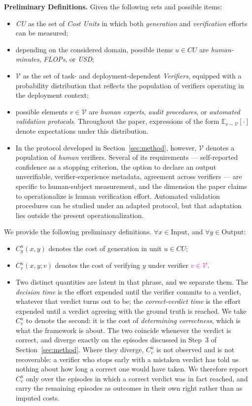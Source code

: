 \documentclass[11pt]{article}
\newcommand{\rev}[1]{\textcolor{magenta}{#1}}
\newcommand{\viola}[1]{\textcolor[HTML]{7030A0}{#1}}
\newcommand{\rev}[1]{#1}
\newcommand{\viola}[1]{#1}
\begin{document}
\textbf{{Preliminary Definitions}.}
{Given the following sets and possible items:}
\begin{itemize}
    \item {\emph{CU} as the set of \emph{Cost Units} in which both \emph{generation} and \emph{verification} efforts can be measured;}
    \item {depending on the considered domain, possible items $u \in CU$ are \emph{human-minutes}, \emph{FLOPs}, or \emph{USD}};
    \item {$\mathcal{V}$ as the set of task- and deployment-dependent \emph{Verifiers}, equipped with a probability distribution that reflects the population of verifiers operating in the deployment context;}
    \item {possible elements $v \in \mathcal{V}$ are \emph{human experts}, \emph{audit procedures}, or \emph{automated validation protocols}. Throughout the paper, expressions of the form $\mathbb{E}_{v \sim \mathcal{V}}[\cdot]$ denote expectations under this distribution.}
    \item \viola{In the protocol developed in Section~\ref{sec:method}, however, $\mathcal{V}$ denotes a population of \emph{human} verifiers. Several of its requirements --- self-reported confidence as a stopping criterion, the option to declare an output unverifiable, verifier-experience metadata, agreement across verifiers --- are specific to human-subject measurement, and the dimension the paper claims to operationalize is human verification effort. Automated validation procedures can be studied under an adapted protocol, but that adaptation lies outside the present operationalization.}

\end{itemize}
{We provide the following preliminary definitions.
$\forall x \in \text{Input}$, and
$\forall y \in \text{Output}$:}
\begin{itemize}
    \item {\mbox{$C_g^{u}(x,y)$} denotes the cost of generation in unit $u \in CU$;}
    \item {\mbox{$C_v^{u}(x,y;v)$} denotes the cost of verifying $y$ under verifier \rev{$v \in \mathcal{V}$}}.
    \item \viola{Two distinct quantities are latent in that phrase, and we separate them. The \emph{decision time} is the effort expended until the verifier commits to a verdict, whatever that verdict turns out to be; the \emph{correct-verdict time} is the effort expended until a verdict agreeing with the ground truth is reached. We take \mbox{$C_v^{u}$} to denote the second: it is the cost of \emph{determining correctness}, which is what the framework is about. The two coincide whenever the verdict is correct, and diverge exactly on the episodes discussed in Step~3 of Section~\ref{sec:method}. Where they diverge, \mbox{$C_v^{u}$} is not observed and is not recoverable: a verifier who stops early with a mistaken verdict has told us nothing about how long a correct one would have taken. We therefore report \mbox{$C_v^{u}$} only over the episodes in which a correct verdict was in fact reached, and carry the remaining episodes as outcomes in their own right rather than as imputed costs.}

\end{itemize}
\end{document}
